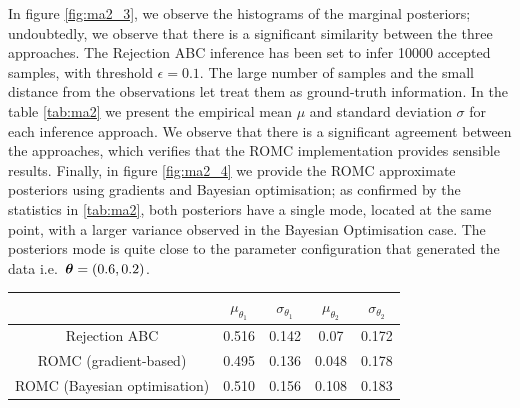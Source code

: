 In figure \ref{fig:ma2_3}, we observe the histograms of the marginal
posteriors; undoubtedly, we observe that there is a significant
similarity between the three approaches. The Rejection ABC inference
has been set to infer 10000 accepted samples, with threshold
$\epsilon=0.1$. The large number of samples and the small distance
from the observations let treat them as ground-truth information. In
the table \ref{tab:ma2} we present the empirical mean $\mu$ and
standard deviation $\sigma$ for each inference approach. We observe
that there is a significant agreement between the approaches, which
verifies that the ROMC implementation provides sensible
results. Finally, in figure \ref{fig:ma2_4} we provide the ROMC
approximate posteriors using gradients and Bayesian optimisation; as
confirmed by the statistics in \ref{tab:ma2}, both posteriors have a
single mode, located at the same point, with a larger variance
observed in the Bayesian Optimisation case. The posteriors mode is
quite close to the parameter configuration that generated the data
i.e.\ $\boldsymbol{\theta} = (0.6, 0.2)$.

\begin{center} \label{tab:ma2}
\begin{tabular}{ c|c|c|c|c }
\hline
& $\mu_{\theta_1}$ & $\sigma_{\theta_1}$ & $\mu_{\theta_2}$ & $\sigma_{\theta_2}$ \\
\hline \hline
Rejection ABC & 0.516 & 0.142 & 0.07 & 0.172 \\
\hline
ROMC (gradient-based) & 0.495 & 0.136 & 0.048 & 0.178 \\
\hline
ROMC (Bayesian optimisation) & 0.510 & 0.156 & 0.108 & 0.183 \\
\hline
\end{tabular}
\end{center}

